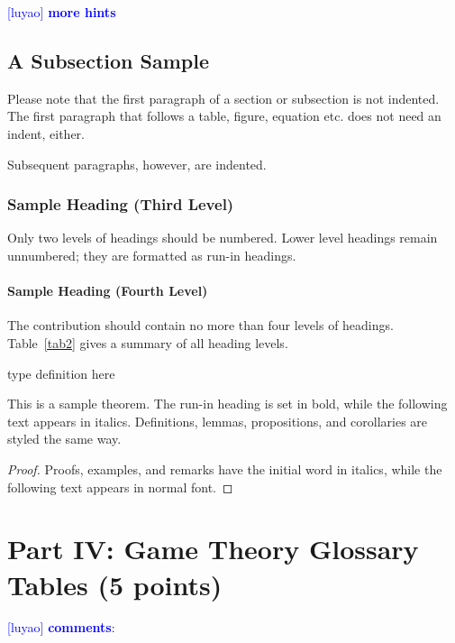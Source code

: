 \documentclass[runningheads]{llncs}
\newcommand{\luyao}[1]{\textcolor{blue}{[luyao] #1}}
\newcommand{\luyao}[1]{}
\begin{document}
\newpage
\noindent\luyao{\textbf{more hints}}
\subsection{A Subsection Sample}
Please note that the first paragraph of a section or subsection is
not indented. The first paragraph that follows a table, figure,
equation etc. does not need an indent, either.

Subsequent paragraphs, however, are indented.

\subsubsection{Sample Heading (Third Level)} Only two levels of
headings should be numbered. Lower level headings remain unnumbered;
they are formatted as run-in headings.

\paragraph{Sample Heading (Fourth Level)}
The contribution should contain no more than four levels of
headings. Table~\ref{tab2} gives a summary of all heading levels.

\begin{definition}
type definition here
\end{definition}

\begin{theorem}
This is a sample theorem. The run-in heading is set in bold, while
the following text appears in italics. Definitions, lemmas,
propositions, and corollaries are styled the same way.
\end{theorem}
%
%
\begin{proof}
Proofs, examples, and remarks have the initial word in italics,
while the following text appears in normal font.
\end{proof}



\section{Part IV: Game Theory Glossary Tables (5 points)}
\luyao{\textbf{comments}}:
\end{document}
